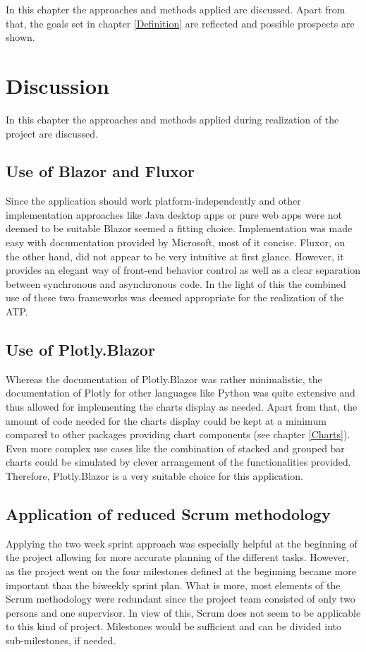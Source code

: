 
In this chapter the approaches and methods applied are discussed. Apart from that, the goals set in chapter \ref{Definition} are reflected and possible prospects are shown.

\section{Discussion}
In this chapter the approaches and methods applied during realization of the project are discussed.

\subsection{Use of Blazor and Fluxor}
Since the application should work platform-independently and other implementation approaches like Java desktop apps or pure web apps were not deemed to be suitable Blazor seemed a fitting choice. Implementation was made easy with documentation provided by Microsoft, most of it concise. Fluxor, on the other hand, did not appear to be very intuitive at first glance. However, it provides an elegant way of front-end behavior control as well as a clear separation between synchronous and asynchronous code. In the light of this the combined use of these two frameworks was deemed appropriate for the realization of the ATP.

\subsection{Use of Plotly.Blazor}
Whereas the documentation of Plotly.Blazor was rather minimalistic, the documentation of Plotly for other languages like Python was quite extensive and thus allowed for implementing the charts display as needed. Apart from that, the amount of code needed for the charts display could be kept at a minimum compared to other packages providing chart components (see chapter \ref{Charts}). Even more complex use cases like the combination of stacked and grouped bar charts could be simulated by clever arrangement of the functionalities provided. Therefore, Plotly.Blazor is a very suitable choice for this application.

\subsection{Application of reduced Scrum methodology}
Applying the two week sprint approach was especially helpful at the beginning of the project allowing for more accurate planning of the different tasks. However, as the project went on the four milestones defined at the beginning became more important than the biweekly sprint plan. What is more, most elements of the Scrum methodology were redundant since the project team consisted of only two persons and one supervisor. In view of this, Scrum does not seem to be applicable to this kind of project. Milestones would be sufficient and can be divided into sub-milestones, if needed.


